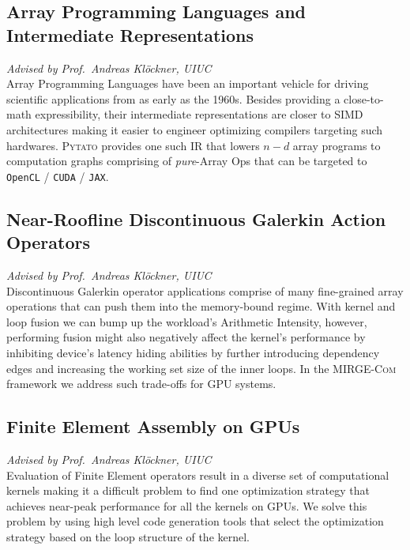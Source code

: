 \documentclass[letterpaper, 13pt]{article}
\begin{document}
\subsection*{Array Programming Languages and Intermediate Representations}
\vspace{-1ex}
\small \textit{Advised by Prof.~Andreas Kl\"{o}ckner, UIUC}\\
Array Programming Languages have been an important vehicle for driving
scientific applications from as early as the 1960s. Besides
providing a close-to-math expressibility, their intermediate representations
are closer to SIMD architectures making it easier to engineer optimizing
compilers targeting such hardwares.
\textsc{Pytato} provides one such IR that
lowers $n-d$ array programs to computation graphs comprising of \textit{pure}-Array
Ops that can be targeted to \texttt{OpenCL} / \texttt{CUDA} / \texttt{JAX}.

\subsection*{Near-Roofline Discontinuous Galerkin Action Operators}
\vspace{-1ex}
\small \textit{Advised by Prof.~Andreas Kl\"{o}ckner, UIUC}\\
Discontinuous Galerkin operator applications comprise of many fine-grained
array operations that can push them into the memory-bound regime. With kernel
and loop fusion we can bump up the workload's Arithmetic Intensity, however,
performing fusion might also negatively affect the kernel's performance by
inhibiting device's latency hiding abilities by further introducing dependency
edges and increasing the working set size of the inner loops. In the \textsc{MIRGE-Com}
framework we address such trade-offs for GPU systems.

\subsection*{Finite Element Assembly on GPUs}
\vspace{-1ex}
\small \textit{Advised by Prof.~Andreas Kl\"{o}ckner, UIUC}\\
Evaluation of Finite Element operators result in a diverse set of
computational kernels making it a difficult problem to find one optimization
strategy that achieves near-peak performance for all the kernels on GPUs.  We
solve this problem by using high level code generation tools that select the
optimization strategy based on the loop structure of the kernel.
\end{document}

